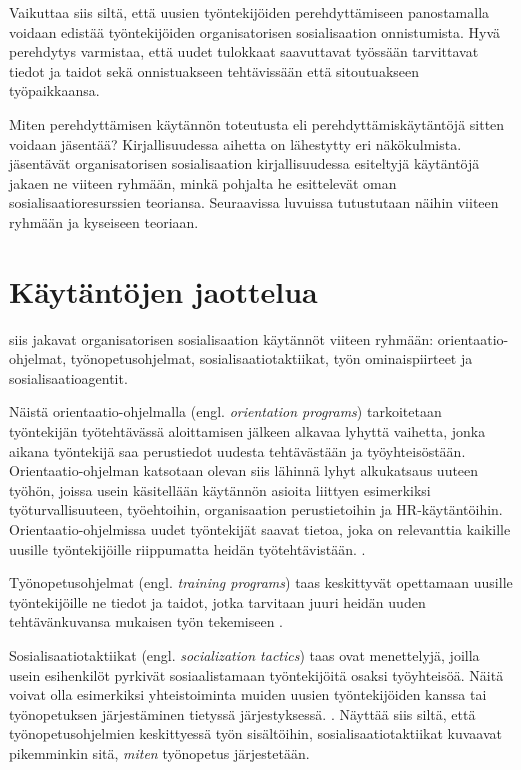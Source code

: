 \documentclass[utf8]{gradu3}
\begin{document}
Vaikuttaa siis siltä, että uusien työntekijöiden perehdyttämiseen panostamalla voidaan edistää työntekijöiden organisatorisen sosialisaation onnistumista. Hyvä perehdytys varmistaa, että uudet tulokkaat saavuttavat työssään tarvittavat tiedot ja taidot sekä onnistuakseen tehtävissään että sitoutuakseen työpaikkaansa.

Miten perehdyttämisen käytännön toteutusta eli perehdyttämiskäytäntöjä sitten voidaan jäsentää? Kirjallisuudessa aihetta on lähestytty eri näkökulmista. \textcite{saks-gruman-2012} jäsentävät organisatorisen sosialisaation kirjallisuudessa esiteltyjä käytäntöjä jakaen ne viiteen ryhmään, minkä pohjalta he esittelevät oman sosialisaatioresurssien teoriansa. Seuraavissa luvuissa tutustutaan näihin viiteen ryhmään ja kyseiseen teoriaan.

\section{Käytäntöjen jaottelua}

\textcite{saks-gruman-2012} siis jakavat organisatorisen sosialisaation käytännöt viiteen ryhmään: orientaatio-ohjelmat, työnopetusohjelmat, sosialisaatiotaktiikat, työn ominaispiirteet ja sosialisaatioagentit.

Näistä orientaatio-ohjelmalla (engl. \textit{orientation programs}) tarkoitetaan työntekijän työtehtävässä aloittamisen jälkeen alkavaa lyhyttä vaihetta, jonka aikana työntekijä saa perustiedot uudesta tehtävästään ja työyhteisöstään. Orientaatio-ohjelman katsotaan olevan siis lähinnä lyhyt alkukatsaus uuteen työhön, joissa usein käsitellään käytännön asioita liittyen esimerkiksi työturvallisuuteen, työehtoihin, organisaation perustietoihin ja HR-käytäntöihin. Orientaatio-ohjelmissa uudet työntekijät saavat tietoa, joka on relevanttia kaikille uusille työntekijöille riippumatta heidän työtehtävistään. \parencite{saks-gruman-2012}.

Työnopetusohjelmat (engl. \textit{training programs}) taas keskittyvät opettamaan uusille työntekijöille ne tiedot ja taidot, jotka tarvitaan juuri heidän uuden tehtävänkuvansa mukaisen työn tekemiseen \parencite{saks-gruman-2012}.

Sosialisaatiotaktiikat (engl. \textit{socialization tactics}) taas ovat menettelyjä, joilla usein esihenkilöt pyrkivät sosiaalistamaan työntekijöitä osaksi työyhteisöä. Näitä voivat olla esimerkiksi yhteistoiminta muiden uusien työntekijöiden kanssa tai työnopetuksen järjestäminen tietyssä järjestyksessä. \parencite{saks-gruman-2012}. Näyttää siis siltä, että työnopetusohjelmien keskittyessä työn sisältöihin, sosialisaatiotaktiikat kuvaavat pikemminkin sitä, \textit{miten} työnopetus järjestetään.
\end{document}
